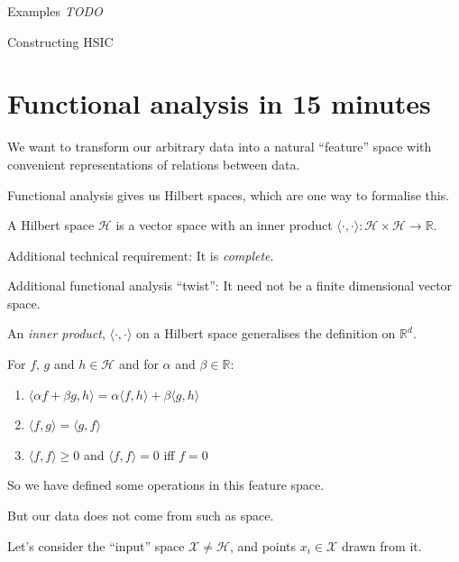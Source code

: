 Examples
\emph{TODO}

Constructing HSIC

\clearpage
\section{Functional analysis in 15 minutes}
We want to transform our arbitrary data into a natural ``feature'' space with convenient representations of relations between data.

Functional analysis gives us Hilbert spaces, which are one way to formalise this.

\clearpage
\begin{defn}
A Hilbert space $\mathcal{H}$ is a vector space with an inner product $\langle\cdot,\cdot\rangle: \mathcal{H}\times\mathcal{H} \rightarrow\mathbb{R}$.
\end{defn}

Additional technical requirement: It is \emph{complete}.

Additional functional analysis ``twist'': It need not be a finite dimensional vector space.
\clearpage
\begin{defn}
An \emph{inner product}, $\langle\cdot,\cdot\rangle$ on a Hilbert space generalises the definition on $\mathbb{R}^d$.

For $f,\,g$ and $h \in \mathcal{H}$ and for $\alpha$ and $\beta \in \mathbb{R}$:
\begin{enumerate}
\item $\langle\alpha f + \beta g, h\rangle = \alpha\langle f, h\rangle + \beta\langle g, h\rangle$
\item $\langle f, g\rangle = \langle g, f \rangle$
\item $\langle f, f \rangle \ge 0$ and $\langle f, f\rangle = 0$ iff $f =0$
\end{enumerate}
\end{defn}

\clearpage

So we have defined some operations in this feature space.

But our data does not come from such as space.

Let's consider the ``input'' space $\mathcal{X}\ne\mathcal{H}$, and points $x_i \in \mathcal{X}$ drawn from it.

